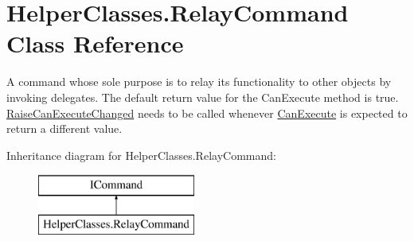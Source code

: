 \hypertarget{class_helper_classes_1_1_relay_command}{}\section{Helper\+Classes.\+Relay\+Command Class Reference}
\label{class_helper_classes_1_1_relay_command}


A command whose sole purpose is to relay its functionality to other objects by invoking delegates. The default return value for the Can\+Execute method is \textquotesingle{}true\textquotesingle{}. \hyperlink{class_helper_classes_1_1_relay_command_a14af980403ef90c4ee57f1395988fa8e}{Raise\+Can\+Execute\+Changed} needs to be called whenever \hyperlink{class_helper_classes_1_1_relay_command_a1e2d080059a2f0f7cd455af612d77bbe}{Can\+Execute} is expected to return a different value.  


Inheritance diagram for Helper\+Classes.\+Relay\+Command\+:\begin{figure}[H]
\begin{center}
\leavevmode
\includegraphics[height=2.000000cm]{class_helper_classes_1_1_relay_command}
\end{center}
\end{figure}
